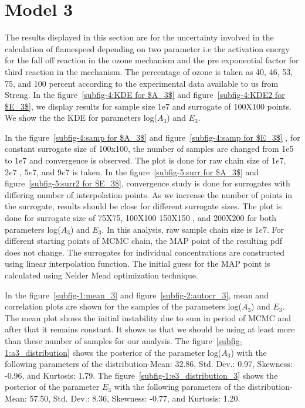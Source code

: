 \section{Model 3}


The results displayed in this section are for the uncertainty involved in the calculation of flamespeed depending  on two parameter i.e the activation energy for the fall off reaction in the ozone mechanism and the pre exponential factor for third reaction in the mechanism. The percentage of ozone is taken as 40, 46, 53, 75, and 100  percent according to the experimental data available to us from Streng\cite{Streng}. In the
figure~\ref{subfig-4:KDE for $A_3$} and figure~\ref{subfig-4:KDE2 for $E_3$},  we display results for sample size 1e7 and surrogate
of 100X100 points.  We show the the KDE for parameters log($A_3$) and $E_3$.

\bigskip

In the figure~\ref{subfig-4:samp for $A_3$} and figure~\ref{subfig-4:samp for $E_3$} , for
constant surrogate size of 100x100, the number of samples are changed from 1e5 to
1e7 and convergence is observed. The plot is done for raw chain size of $1e7$, $2e7$ , $5e7$, and $9e7$ is taken. In the figure~\ref{subfig-5:surr for $A_3$} and figure~\ref{subfig-5:surr2 for $E_3$},
convergence study is done for surrogates with differing number of interpolation points. As we increase the number of points in the surrogate, results should be close for different surrogate sizes. The plot is done for surrogate size of 75X75, 100X100 150X150 , and 200X200 for both parameters log($A_3$) and $E_3$. In this analysis, raw sample chain size is $1e7$. For different starting points of MCMC chain, the MAP point of the resulting pdf does not change. The surrogates for individual concentrations are constructed using linear interpolation
function. The initial guess for the MAP point is calculated using Nelder Mead optimization technique. 

\bigskip

In the
figure~\ref{subfig-1:mean_3} and figure~\ref{subfig-2:autocr_3},  mean and correlation plots are shown for
the samples of the parameters log($A_3$) and $E_3$. The mean plot shows the initial instability due to sum in period of MCMC and after that it remains constant. It shows us that we should be using at least more than these number of samples for our analysis. The figure~\ref{subfig-1:a3_distribution} shows the posterior of the parameter log($A_3$) with the following parameters of the distribution-Mean:  32.86, Std. Dev.:  0.97, Skewness:  -0.96, and Kurtosis:  1.79.  The figure~\ref{subfig-1:e3_distribution_3} shows the posterior of the parameter $E_3$ with the following parameters of the distribution- Mean:  57.50, Std. Dev.:  8.36, Skewness:  -0.77, and Kurtosis:  1.20.


